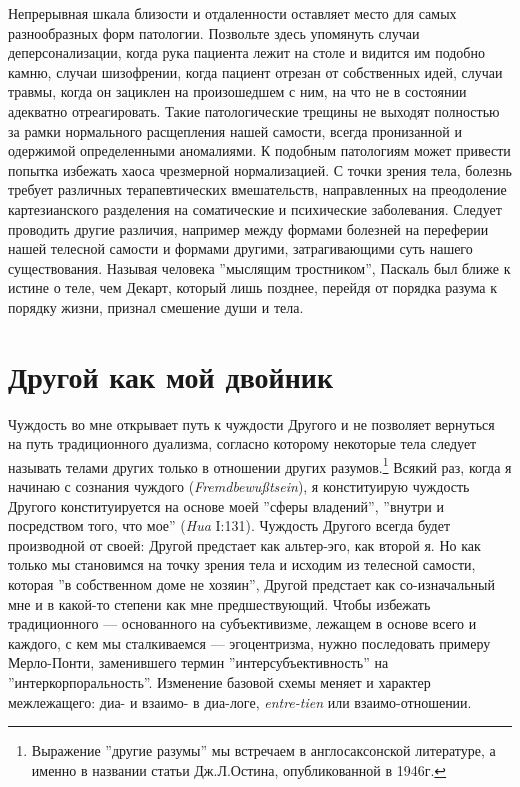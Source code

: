\documentclass[12pt]{book}
\begin{document}
Непрерывная шкала близости и отдаленности оставляет место для самых разнообразных форм патологии. Позвольте здесь упомянуть случаи деперсонализации, когда рука пациента лежит на столе и видится им подобно камню, случаи шизофрении, когда пациент отрезан от собственных идей, случаи травмы, когда он зациклен на произошедшем с ним, на что не в состоянии адекватно отреагировать. Такие патологические трещины не выходят полностью за рамки нормального расщепления нашей самости, всегда пронизанной и одержимой определенными аномалиями. К подобным патологиям может привести попытка избежать хаоса чрезмерной нормализацией. С точки зрения тела, болезнь требует различных терапевтических вмешательств, направленных на преодоление картезианского разделения на соматические и психические заболевания. Следует проводить другие различия, например между формами болезней на переферии нашей телесной самости и формами другими, затрагивающими суть нашего существования. Называя человека ''мыслящим тростником'', Паскаль был ближе к истине о теле, чем Декарт, который лишь позднее, перейдя от порядка разума к порядку жизни, признал смешение души и тела.

\section{Другой как мой двойник}

Чуждость во мне открывает путь к чуждости Другого и не позволяет вернуться на путь традиционного дуализма, согласно которому некоторые тела следует называть телами других только в отношении других разумов.\footnote{Выражение ''другие разумы'' мы встречаем в англосаксонской литературе, а именно в названии статьи Дж.Л.Остина, опубликованной в 1946г.} Всякий раз, когда я начинаю с сознания чуждого (\textit{Fremdbewußtsein}), я конституирую чуждость Другого конституируется на основе моей ''сферы владений'', ''внутри и посредством того, что мое'' (\textit{Hua} I:131). Чуждость Другого всегда будет производной от своей: Другой предстает как альтер-эго, как второй я. Но как только мы становимся на точку зрения тела и исходим из телесной самости, которая ''в собственном доме не хозяин'', Другой предстает как со-изначальный мне и в какой-то степени как мне предшествующий. Чтобы избежать традиционного --- основанного на субъективизме, лежащем в основе всего и каждого, с кем мы сталкиваемся --- эгоцентризма, нужно последовать примеру Мерло-Понти, заменившего термин ''интерсубъективность'' на ''интеркорпоральность''. Изменение базовой схемы меняет и характер межлежащего: диа- и взаимо- в диа-логе, \textit{entre-tien} или взаимо-отношении.
\end{document}
